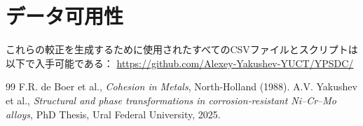 \documentclass[12pt,a4paper]{article}
\begin{document}
	
	\section{データ可用性}
	これらの較正を生成するために使用されたすべてのCSVファイルとスクリプトは以下で入手可能である：
	\url{https://github.com/Alexey-Yakushev-YUCT/YPSDC/}
	
	\begin{thebibliography}{99}
		 F.R. de Boer et al., \emph{Cohesion in Metals}, North-Holland (1988).
		 A.V. Yakushev et al., \emph{Structural and phase transformations in corrosion‑resistant Ni–Cr–Mo alloys}, PhD Thesis, Ural Federal University, 2025.
	\end{thebibliography}
	
\end{document}
